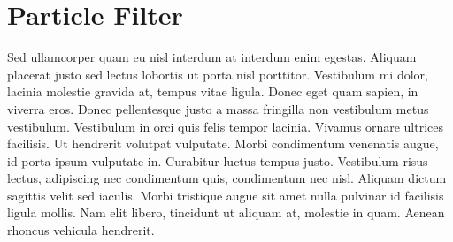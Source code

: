 
\section{Particle Filter}

Sed ullamcorper quam eu nisl interdum at interdum enim egestas. Aliquam placerat justo sed lectus lobortis ut porta nisl porttitor. Vestibulum mi dolor, lacinia molestie gravida at, tempus vitae ligula. Donec eget quam sapien, in viverra eros. Donec pellentesque justo a massa fringilla non vestibulum metus vestibulum. Vestibulum in orci quis felis tempor lacinia. Vivamus ornare ultrices facilisis. Ut hendrerit volutpat vulputate. Morbi condimentum venenatis augue, id porta ipsum vulputate in. Curabitur luctus tempus justo. Vestibulum risus lectus, adipiscing nec condimentum quis, condimentum nec nisl. Aliquam dictum sagittis velit sed iaculis. Morbi tristique augue sit amet nulla pulvinar id facilisis ligula mollis. Nam elit libero, tincidunt ut aliquam at, molestie in quam. Aenean rhoncus vehicula hendrerit.